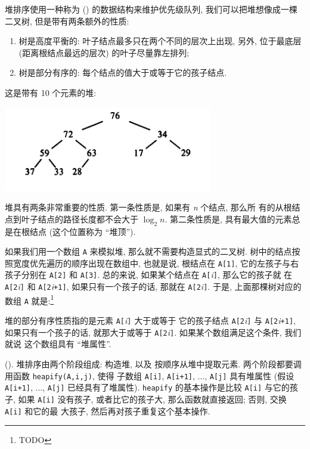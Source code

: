 堆排序使用一种称为  () 的数据结构来维护优先级队列,
我们可以把堆想像成一棵二叉树, 但是带有两条额外的性质:
\begin{enumerate}
    \item 树是高度平衡的: 叶子结点最多只在两个不同的层次上出现, 另外,
        位于最底层 (距离根结点最远的层次) 的叶子尽量靠左排列;
    \item 树是部分有序的: 每个结点的值大于或等于它的孩子结点.
\end{enumerate}
这是带有 10 个元素的堆:
\begin{center}
    \includegraphics[scale=0.8]{images/heap_with_10_elem.png}
\end{center}

堆具有两条非常重要的性质. 第一条性质是, 如果有 \textit{n} 个结点, 那么所
有的从根结点到叶子结点的路径长度都不会大于 $\log_2 n$. 第二条性质是,
具有最大值的元素总是在根结点 (这个位置称为 ``堆顶'').

如果我们用一个数组 \texttt{A} 来模拟堆, 那么就不需要构造显式的二叉树.
树中的结点按照宽度优先遍历的顺序出现在数组中, 也就是说, 根结点在 
\texttt{A[1]}, 它的左孩子与右孩子分别在 \texttt{A[2]} 和 \texttt{A[3]}.
总的来说, 如果某个结点在 \texttt{A[}\textit{i}\texttt{]}, 那么它的孩子就
在 \texttt{A[2}\textit{i}\texttt{]} 和 \texttt{A[2}\textit{i}\texttt{+1]},
如果只有一个孩子的话, 那就在 \texttt{A[2}\textit{i}\texttt{]}.
于是, 上面那棵树对应的数组 \texttt{A} 就是:\footnote{TODO}

堆的部分有序性质指的是元素 \texttt{A[}\textit{i}\texttt{]} 大于或等于
它的孩子结点 \texttt{A[2}\textit{i}\texttt{]} 与
\texttt{A[2}\textit{i}\texttt{+1]}, 如果只有一个孩子的话, 就那大于或等于
\texttt{A[2}\textit{i}\texttt{]}. 如果某个数组满足这个条件, 我们就说
这个数组具有 ``堆属性''.

 (). 堆排序由两个阶段组成: 构造堆, 以及 
按顺序从堆中提取元素. 两个阶段都要调用函数 \texttt{heapify(A,i,j)}, 使得
子数组 \texttt{A[i]}, \texttt{A[i+1]}, ..., \texttt{A[j]} 具有堆属性 (假设 
\texttt{A[i+1]}, ..., \texttt{A[j]} 已经具有了堆属性). \texttt{heapify}
的基本操作是比较 \texttt{A[i]} 与它的孩子, 如果 \texttt{A[i]} 没有孩子,
或者比它的孩子大, 那么函数就直接返回; 否则, 交换 \texttt{A[i]} 和它的最
大孩子, 然后再对孩子重复这个基本操作.

